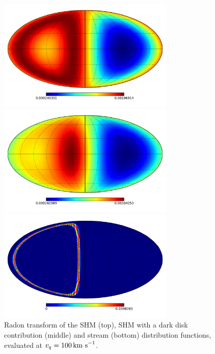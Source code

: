 \begin{figure}[h!]
  \centering
  \includegraphics[width=0.75\textwidth]{Directional/SHMradon.pdf}

  \includegraphics[width=0.75\textwidth]{Directional/DDradon.pdf}

  \includegraphics[width=0.75\textwidth]{Directional/STREAMradon.pdf}

\caption[Radon transform examples]{Radon transform of the SHM (top), SHM with a dark disk contribution (middle) and stream (bottom) distribution functions, evaluated at $v_q = 100 \,\textrm{km s}^{-1}$.}
  \label{fig:directional:Radon}
\end{figure}


